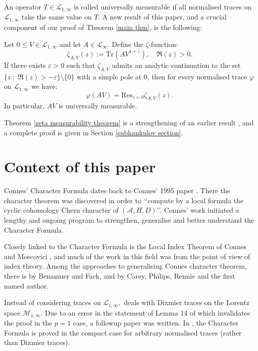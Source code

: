     An operator $T \in \mathcal{L}_{1,\infty}$ is called universally measurable if all normalised traces on $\mathcal{L}_{1,\infty}$ take the same value on $T$.
    A new result of this paper, and a crucial component of our proof of Theorem \ref{main thm}, is the following:    
    \begin{thm}\label{zeta measurability theorem} 
        Let $0\leq V\in\mathcal{L}_{1,\infty}$ and let $A\in\mathcal{L}_{\infty}.$ 
        Define the $\zeta$-function: 
        \begin{equation*}
            \zeta_{A,V}(z) := \mathrm{Tr}(AV^{1+z}),\quad \Re(z) > 0.
        \end{equation*}
        If there exists $\varepsilon > 0$ such that $\zeta_{A,V}$ admits an analytic continuation to the set $\{z\;:\; \Re(z) > -\varepsilon\}\setminus \{0\}$
        with a simple pole at $0$, then for every normalised trace $\varphi$ on $\mathcal{L}_{1,\infty}$ we have:
        \begin{equation*}
            \varphi(AV)= \mathrm{Res}_{z=0}\zeta_{A,V}(z).
        \end{equation*}
        In particular, $AV$ is universally measurable.
    \end{thm}
    Theorem \ref{zeta measurability theorem} is a strengthening of an earlier result \cite[Theorem 4.13]{SUZ-indiana}, and a complete proof is given in Section \ref{subhankulov section}.
   
\section{Context of this paper}

    Connes' Character Formula dates back to Connes' 1995 paper \cite{Connes-original-spectral-1995}. There the character theorem was discovered in order to \lq\lq compute by a local formula the cyclic cohomology Chern character of $(\mathcal{A},H,D)$\rq\rq. Connes' work initiated a lengthy and ongoing program to strengthen, generalise and better understand the Character Formula.
    
    Closely linked to the Character Formula is the Local Index Theorem of Connes and Moscovici \cite{Connes-Moscovici}, and much of the work in this field was from the point of view of index theory. Among the approaches to generalising Connes character theorem, there is \cite{BF} by Benamuer and Fack, and \cite{CPRS1} by Carey, Philips, Rennie and the first named author.
    
    Instead of considering traces on $\mathcal{L}_{1,\infty},$ \cite{CPRS1} deals with Dixmier traces on the Lorentz space $\mathcal{M}_{1,\infty}.$ 
    Due to an error in the statement of Lemma 14 of \cite{CPRS1} which invalidates the proof in the $p=1$ case, a followup paper \cite{CRSZ} was
    written. In \cite{CRSZ}, the Character Formula is proved in the compact case for arbitrary normalised traces (rather than Dixmier traces).
    
